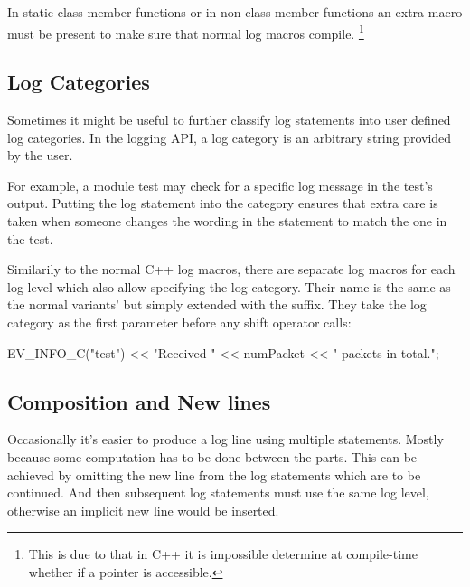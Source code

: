 In static class member functions or in non-class member functions an extra
 macro must be present to make sure that normal log
macros compile. \footnote{This is due to that in C++ it is impossible
determine at compile-time whether if a  pointer is accessible.}

\begin{cpp}
void findModule(const char *name, cModule *from)
{
    EV_STATICCONTEXT;
    EV_TRACE << "findModule(" << name << ", " << from << ");" << endl;
\end{cpp}

\subsection{Log Categories}
\label{sec:sim-lib:log-categories}

Sometimes it might be useful to further classify log statements into user
defined log categories. In the {\opp} logging API, a log category is an
arbitrary string provided by the user.

For example, a module test may check for a specific log message in the test's
output. Putting the log statement into the  category ensures that
extra care is taken when someone changes the wording in the statement to match
the one in the test.

Similarily to the normal C++ log macros, there are separate log macros for each
log level which also allow specifying the log category. Their name is the same
as the normal variants' but simply extended with the  suffix. They
take the log category as the first parameter before any shift operator calls:

\begin{cpp}
EV_INFO_C("test") << "Received " << numPacket << " packets in total.\n";
\end{cpp}

\subsection{Composition and New lines}
\label{sec:sim-lib:logging-composition-and-new-lines}

Occasionally it's easier to produce a log line using multiple statements.
Mostly because some computation has to be done between the parts. This can be
achieved by omitting the new line from the log statements which are to be
continued. And then subsequent log statements must use the same log level,
otherwise an implicit new line would be inserted.

